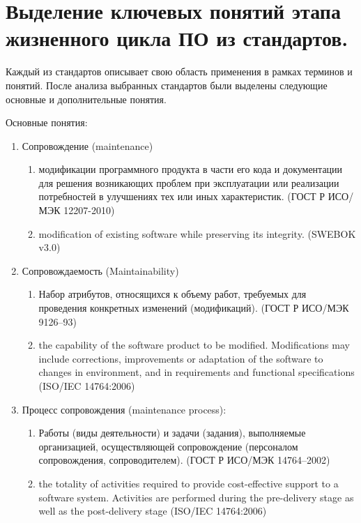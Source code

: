 
\pagebreak


\section{Выделение ключевых понятий этапа жизненного цикла ПО из стандартов.}

Каждый из стандартов описывает свою область применения в рамках терминов и понятий.
После анализа выбранных стандартов были выделены следующие основные и дополнительные понятия.


Основные понятия:
\begin{enumerate}
    \item Сопровождение (maintenance)
    \begin{enumerate}
        \item модификации программного продукта в части его кода и документации
        для решения возникающих проблем при эксплуатации или реализации потребностей в
        улучшениях тех или иных характеристик.
        (ГОСТ Р ИСО/МЭК 12207-2010)
        \item modification of existing software while preserving its integrity.
        (SWEBOK v3.0)
    \end{enumerate}

    \item Сопровождаемость (Maintainability)
    \begin{enumerate}
        \item Набор атрибутов, относящихся к объему работ, требуемых для проведения конкретных изменений (модификаций).
        (ГОСТ Р ИСО/МЭК 9126--93)
        \item the capability of the software product to be modified.
        Modifications may include corrections, improvements or adaptation of the software to changes in environment, and in requirements and functional specifications
        (ISO/IEC 14764:2006)
    \end{enumerate}

    \item Процесс сопровождения (maintenance process):
    \begin{enumerate}
        \item Работы (виды деятельности) и задачи (задания), выполняемые организацией, осуществляющей сопровождение (персоналом сопровождения, сопроводителем).
        (ГОСТ Р ИСО/МЭК 14764--2002)
        \item the totality of activities required to provide cost-effective support to a software system.
        Activities are performed during the pre-delivery stage as well as the post-delivery stage
        (ISO/IEC 14764:2006)
    \end{enumerate}
\end{enumerate}


